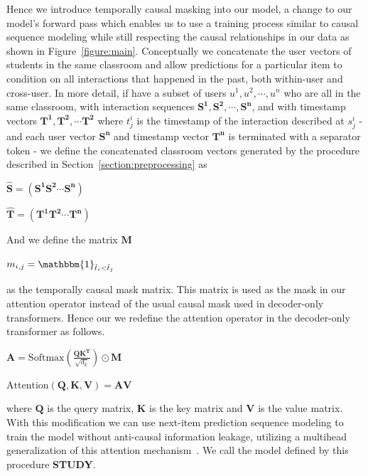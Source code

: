 \documentclass{article}
\begin{document}
Hence we introduce temporally causal masking into our model, a change to our model's forward pass which enables us to use a training process similar to causal sequence modeling while still respecting the causal relationships in our data as shown in Figure~\ref{figure:main}. Conceptually we concatenate the user vectors of students in the same classroom and allow predictions for a particular item to condition on all interactions that happened in the past, both within-user and cross-user. In more detail, if have a subset of users $u^1, u^2, \cdots, u^n$  who are all in the same classroom, with interaction sequences $\boldsymbol{S^1}, \boldsymbol{S^2}, \cdots, \boldsymbol{S^n}$,  and with timestamp vectors $\boldsymbol{T^1},\boldsymbol{T^2}, \cdots \boldsymbol{T^2}$ where $t^i_j$ is the timestamp of the interaction described at $s^i_j$ - and each user vector  $\boldsymbol{S^n}$ and timestamp vector  $\boldsymbol{T^n}$ is terminated with a separator token - we define the concatenated classroom vectors generated by the procedure described in Section~\ref{section:preprocessing} as
\begin{center}
    $\boldsymbol{\hat{S}} = \left( \boldsymbol{S^1} \boldsymbol{S^2} \cdots \boldsymbol{S^n} \right)$
    
    $\boldsymbol{\hat{T}} = \left( \boldsymbol{T^1} \boldsymbol{T^2} \cdots \boldsymbol{T^n} \right)$
\end{center}

And we define the matrix $\boldsymbol{M}$ 
\begin{center}
    $m_{i,j} = \mathbbm{1}_{\hat{t}_i < \hat{t}_j}$
\end{center}
as the temporally causal mask matrix. This matrix is used as the mask in our attention operator instead of the usual causal mask used in decoder-only transformers. Hence our we redefine the attention operator in the decoder-only transformer as follows.
\begin{center}
    $\boldsymbol{A} = \mathrm{Softmax}(\frac{ \boldsymbol{Q K^T}}{\sqrt{d_k}}) \odot \boldsymbol{M}$
    
    $\mathrm{Attention(\boldsymbol{Q}, \boldsymbol{K},  \boldsymbol{V})} =  \boldsymbol{A V}$ 
\end{center}
where  $\boldsymbol{Q}$ is the query matrix,  $\boldsymbol{K}$ is the key matrix and  $\boldsymbol{V}$ is the value matrix. With this modification we can use next-item prediction sequence modeling to train the model without anti-causal information leakage, utilizing a multihead generalization of this attention mechanism~\cite{vaswani2017attention}. We call the model defined by this procedure \textbf{STUDY}. 
\end{document}

